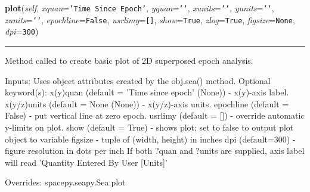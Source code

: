 \hspace{.8\funcindent}\begin{boxedminipage}{\funcwidth}

    \raggedright \textbf{plot}(\textit{self}, \textit{xquan}={\tt \texttt{'}\texttt{Time Since Epoch}\texttt{'}}, \textit{yquan}={\tt \texttt{'}\texttt{}\texttt{'}}, \textit{xunits}={\tt \texttt{'}\texttt{}\texttt{'}}, \textit{yunits}={\tt \texttt{'}\texttt{}\texttt{'}}, \textit{zunits}={\tt \texttt{'}\texttt{}\texttt{'}}, \textit{epochline}={\tt False}, \textit{usrlimy}={\tt \texttt{[}\texttt{]}}, \textit{show}={\tt True}, \textit{zlog}={\tt True}, \textit{figsize}={\tt None}, \textit{dpi}={\tt 300})

    \vspace{-1.5ex}

    \rule{\textwidth}{0.5\fboxrule}
\setlength{\parskip}{2ex}
    Method called to create basic plot of 2D superposed epoch analysis.

    Inputs: Uses object attributes created by the obj.sea() method. 
    Optional keyword(s): x(y)quan (default = 'Time since epoch' (None)) - 
    x(y)-axis label. x(y/z)units (default = None (None)) - x(y/z)-axis 
    units. epochline (default = False) - put vertical line at zero epoch. 
    usrlimy (default = []) - override automatic y-limits on plot. show 
    (default = True) - shows plot; set to false to output plot object to 
    variable figsize - tuple of (width, height) in inches dpi (default=300)
    - figure resolution in dots per inch If both ?quan and ?units are 
    supplied, axis label will read 'Quantity Entered By User [Units]'

\setlength{\parskip}{1ex}
      Overrides: spacepy.seapy.Sea.plot

    \end{boxedminipage}

    \vspace{0.5ex}

